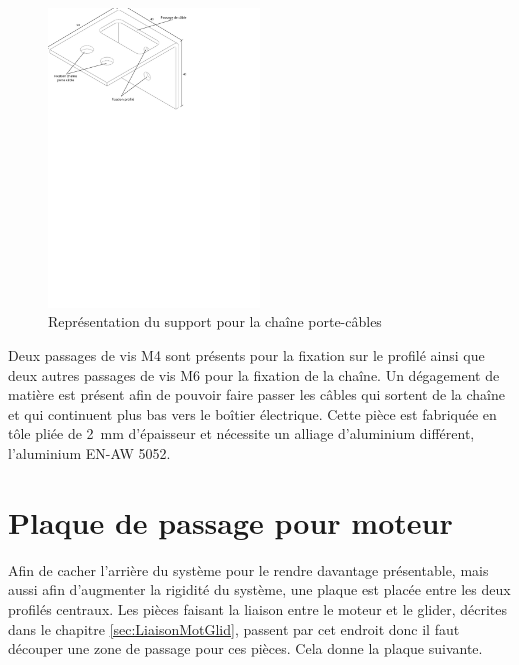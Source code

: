 \begin{figure}[H]
    \centering
    \includegraphics[width = 0.5\textwidth]{assets/figures/SupportChaineCable.svg}
    \caption{Représentation du support pour la chaîne porte-câbles}
    \label{fig:SupChaineCable}
\end{figure}

Deux passages de vis M4 sont présents pour la fixation sur le profilé ainsi que deux autres passages de vis M6 pour la fixation de la chaîne.
Un dégagement de matière est présent afin de pouvoir faire passer les câbles qui sortent de la chaîne et qui continuent plus bas vers le boîtier
électrique. Cette pièce est fabriquée en tôle pliée de 2~mm d'épaisseur et nécessite un alliage d'aluminium différent, l'aluminium EN-AW 5052.

\section{Plaque de passage pour moteur}\label{sec:PlaPassMot}
Afin de cacher l'arrière du système pour le rendre davantage présentable, mais aussi afin d'augmenter la rigidité du système, une plaque est placée
entre les deux profilés centraux. Les pièces faisant la liaison entre le moteur et le glider, décrites dans le chapitre \ref{sec:LiaisonMotGlid},
passent par cet endroit donc il faut découper une zone de passage pour ces pièces. Cela donne la plaque suivante.

